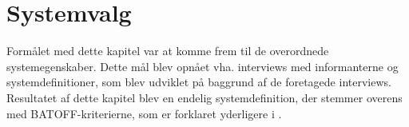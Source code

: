 \chapter{Systemvalg}
\label{chap:systemvalg}
Formålet med dette kapitel var at komme frem til de overordnede systemegenskaber. Dette mål blev opnået vha. interviews med informanterne og systemdefinitioner, som blev udviklet på baggrund af de foretagede interviews. Resultatet af dette kapitel blev en endelig systemdefinition, der stemmer overens med BATOFF-kriterierne, som er forklaret yderligere i .



